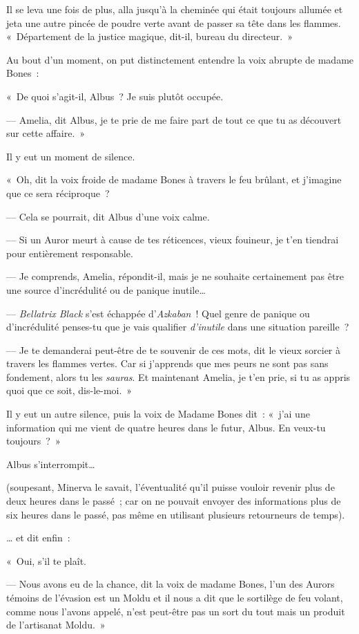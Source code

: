 Il se leva une fois de plus, alla jusqu'à la cheminée qui était toujours allumée et jeta une autre pincée de poudre verte avant de passer sa tête dans les flammes.
«~Département de la justice magique, dit-il, bureau du directeur.~»

Au bout d'un moment, on put distinctement entendre la voix abrupte de madame Bones~:

«~De quoi s'agit-il, Albus~?
Je suis plutôt occupée.

--- Amelia, dit Albus, je te prie de me faire part de tout ce que tu as découvert sur cette affaire.~»

Il y eut un moment de silence.

«~Oh, dit la voix froide de madame Bones à travers le feu brûlant, et j'imagine que ce sera réciproque~?

--- Cela se pourrait, dit Albus d'une voix calme.

--- Si un Auror meurt à cause de tes réticences, vieux fouineur, je t'en tiendrai pour entièrement responsable.

--- Je comprends, Amelia, répondit-il, mais je ne souhaite certainement pas être une source d'incrédulité ou de panique inutile…

--- \emph{Bellatrix Black} s'est échappée d'\emph{Azkaban}~!
Quel genre de panique ou d'incrédulité penses-tu que je vais qualifier \emph{d'inutile} dans une situation pareille~?

--- Je te demanderai peut-être de te souvenir de ces mots, dit le vieux sorcier à travers les flammes vertes.
Car si j'apprends que mes peurs ne sont pas sans fondement, alors tu les \emph{sauras}.
Et maintenant Amelia, je t'en prie, si tu as appris quoi que ce soit, dis-le-moi.~»

Il y eut un autre silence, puis la voix de Madame Bones dit~: «~j'ai une information qui me vient de quatre heures dans le futur, Albus.
En veux-tu toujours~?~»

Albus s'interrompit…

(soupesant, Minerva le savait, l'éventualité qu'il puisse vouloir revenir plus de deux heures dans le passé~; car on ne pouvait envoyer des informations plus de six heures dans le passé, pas même en utilisant plusieurs retourneurs de temps).

… et dit enfin~:

«~Oui, s'il te plaît.

--- Nous avons eu de la chance, dit la voix de madame Bones, l'un des Aurors témoins de l'évasion est un Moldu et il nous a dit que le sortilège de feu volant, comme nous l'avons appelé, n'est peut-être pas un sort du tout mais un produit de l'artisanat Moldu.~»

